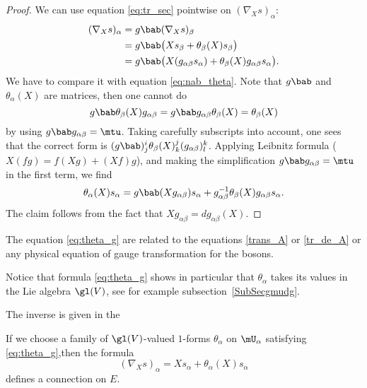 \begin{proof}
We can use equation \eqref{eq:tr_sec} pointwise on $(\nabla_X s)_{\alpha}$:
\begin{equation}
\begin{split}
(\nabla_X s)_{\alpha}&=g\bab(\nabla_Xs)_{\beta}\\
                  &=g\bab\big(   Xs_{\beta}+\theta_{\beta}(X)s_{\beta}   \big) \\
                  &=g\bab\big(   X(g_{\alpha\beta} s_{\alpha})+\theta_{\beta}(X)g_{\alpha\beta} s_{\alpha}   \big).
\end{split}
\end{equation}
We have to compare it with equation \eqref{eq:nab_theta}. Note that $g\bab$ and $\theta_{\alpha}(X)$ are matrices, then one cannot do
\[
   g\bab\theta_{\beta}(X)g_{\alpha\beta} =g\bab g_{\alpha\beta}\theta_{\beta}(X)=\theta_{\beta}(X)
\]
by using $g\bab g_{\alpha\beta}=\mtu$.  Taking carefully subscripts into account, one sees that the correct form is $(g\bab)^i_j\theta_{\beta}(X)^j_k(g_{\alpha\beta})^k_l$. Applying Leibnitz formula ($X(fg)=f(Xg)+(Xf)g$), and making the simplification $g\bab g_{\alpha\beta}=\mtu$ in the first term, we find
\[
  \theta_{\alpha}(X)s_{\alpha}=g\bab(Xg_{\alpha\beta})s_{\alpha}+g_{\alpha\beta}^{-1}\theta_{\beta}(X)g_{\alpha\beta} s_{\alpha}.
\]
The claim follows from the fact that $Xg_{\alpha\beta}=dg_{\alpha\beta}(X)$.
\end{proof}


\begin{normaltext}
    The equation \eqref{eq:theta_g} are related to the equations \eqref{trans_A} or \eqref{tr_de_A} or any physical equation of gauge transformation for the bosons.
\end{normaltext}

\begin{normaltext}
    Notice that formula \eqref{eq:theta_g} shows in particular that $\theta_{\alpha}$ takes its values in the Lie algebra $\gl(V)$, see for example subsection~\ref{SubSecgmudg}.
\end{normaltext}

The inverse is given in the
\begin{proposition}	\label{Propformconnve}
If we choose a family of $\gl(V)$-valued $1$-forms $\theta_{\alpha}$ on $\mU_{\alpha}$ satisfying \eqref{eq:theta_g},then the formula
\[
  (\nabla_Xs)_{\alpha}=Xs_{\alpha}+\theta_{\alpha}(X)s_{\alpha}
\]
defines a connection on $E$.\label{prop:thet_conn_F}
\end{proposition}

